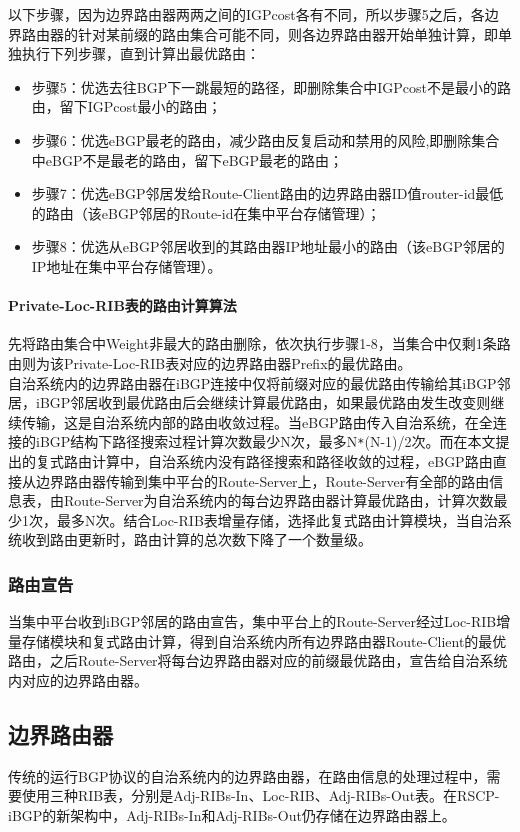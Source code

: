 以下步骤，因为边界路由器两两之间的IGPcost各有不同，所以步骤5之后，各边界路由器的针对某前缀的路由集合可能不同，则各边界路由器开始单独计算，即单独执行下列步骤，直到计算出最优路由：
\begin{itemize}
    \item 步骤5：优选去往BGP下一跳最短的路径，即删除集合中IGPcost不是最小的路由，留下IGPcost最小的路由；
    \item 步骤6：优选eBGP最老的路由，减少路由反复启动和禁用的风险,即删除集合中eBGP不是最老的路由，留下eBGP最老的路由；
    \item 步骤7：优选eBGP邻居发给Route-Client路由的边界路由器ID值router-id最低的路由（该eBGP邻居的Route-id在集中平台存储管理）；
    \item 步骤8：优选从eBGP邻居收到的其路由器IP地址最小的路由（该eBGP邻居的IP地址在集中平台存储管理）。
\end{itemize}


\paragraph{Private-Loc-RIB表的路由计算算法}

先将路由集合中Weight非最大的路由删除，依次执行步骤1-8，当集合中仅剩1条路由则为该Private-Loc-RIB表对应的边界路由器Prefix的最优路由。\\

自治系统内的边界路由器在iBGP连接中仅将前缀对应的最优路由传输给其iBGP邻居，iBGP邻居收到最优路由后会继续计算最优路由，如果最优路由发生改变则继续传输，这是自治系统内部的路由收敛过程。当eBGP路由传入自治系统，在全连接的iBGP结构下路径搜索过程计算次数最少N次，最多N\verb+*+(N-1)/2次。而在本文提出的复式路由计算中，自治系统内没有路径搜索和路径收敛的过程，eBGP路由直接从边界路由器传输到集中平台的Route-Server上，Route-Server有全部的路由信息表，由Route-Server为自治系统内的每台边界路由器计算最优路由，计算次数最少1次，最多N次。结合Loc-RIB表增量存储，选择此复式路由计算模块，当自治系统收到路由更新时，路由计算的总次数下降了一个数量级。

\subsubsection{路由宣告}
当集中平台收到iBGP邻居的路由宣告，集中平台上的Route-Server经过Loc-RIB增量存储模块和复式路由计算，得到自治系统内所有边界路由器Route-Client的最优路由，之后Route-Server将每台边界路由器对应的前缀最优路由，宣告给自治系统内对应的边界路由器。

\subsection{边界路由器}
传统的运行BGP协议的自治系统内的边界路由器，在路由信息的处理过程中，需要使用三种RIB表，分别是Adj-RIBs-In、Loc-RIB、Adj-RIBs-Out表。在RSCP-iBGP的新架构中，Adj-RIBs-In和Adj-RIBs-Out仍存储在边界路由器上。

